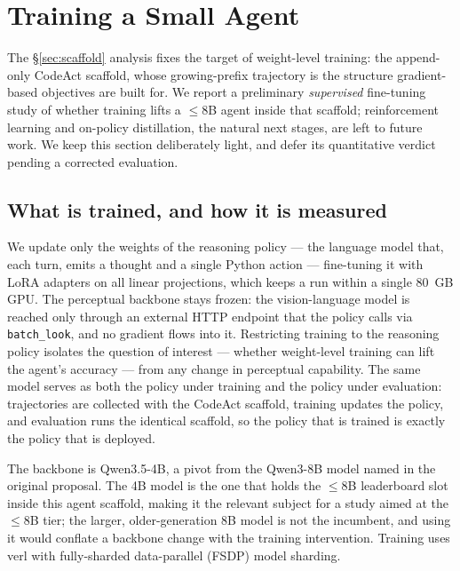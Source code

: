 \section{Training a Small Agent}
\label{sec:training}

The \S\ref{sec:scaffold} analysis fixes the target of weight-level training: the append-only CodeAct scaffold, whose growing-prefix trajectory is the structure gradient-based objectives are built for. We report a preliminary \emph{supervised} fine-tuning study of whether training lifts a $\leq$8B agent inside that scaffold; reinforcement learning and on-policy distillation, the natural next stages, are left to future work. We keep this section deliberately light, and defer its quantitative verdict pending a corrected evaluation.

\subsection{What is trained, and how it is measured}

We update only the weights of the reasoning policy --- the language model that, each turn, emits a thought and a single Python action --- fine-tuning it with LoRA adapters \citep{lora} on all linear projections, which keeps a run within a single 80~GB GPU. The perceptual backbone stays frozen: the vision-language model is reached only through an external HTTP endpoint that the policy calls via \texttt{batch\_look}, and no gradient flows into it. Restricting training to the reasoning policy isolates the question of interest --- whether weight-level training can lift the agent's accuracy --- from any change in perceptual capability. The same model serves as both the policy under training and the policy under evaluation: trajectories are collected with the CodeAct scaffold, training updates the policy, and evaluation runs the identical scaffold, so the policy that is trained is exactly the policy that is deployed.

The backbone is Qwen3.5-4B, a pivot from the Qwen3-8B model named in the original proposal. The 4B model is the one that holds the $\leq$8B leaderboard slot inside this agent scaffold, making it the relevant subject for a study aimed at the $\leq$8B tier; the larger, older-generation 8B model is not the incumbent, and using it would conflate a backbone change with the training intervention. Training uses verl \citep{verl} with fully-sharded data-parallel (FSDP) model sharding.

